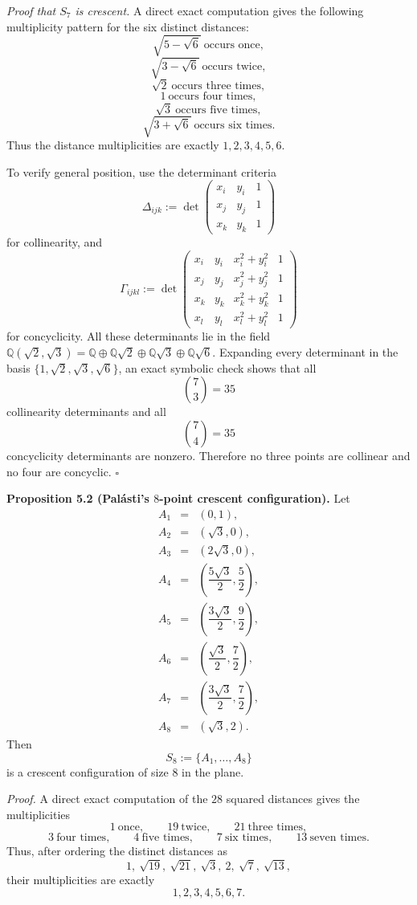 \smallskip
\noindent\emph{Proof that $S_7$ is crescent.}
A direct exact computation gives the following multiplicity pattern for the six distinct distances:
\[
\sqrt{5-\sqrt6}\ \mbox{occurs once},
\]
\[
\sqrt{3-\sqrt6}\ \mbox{occurs twice},
\]
\[
\sqrt2\ \mbox{occurs three times},
\]
\[
1\ \mbox{occurs four times},
\]
\[
\sqrt3\ \mbox{occurs five times},
\]
\[
\sqrt{3+\sqrt6}\ \mbox{occurs six times}.
\]
Thus the distance multiplicities are exactly $1,2,3,4,5,6$.

To verify general position, use the determinant criteria
\[
\Delta_{ijk}:=\det\begin{pmatrix}
x_i&y_i&1\\
x_j&y_j&1\\
x_k&y_k&1
\end{pmatrix}
\]
for collinearity, and
\[
\Gamma_{ijkl}:=\det\begin{pmatrix}
x_i&y_i&x_i^2+y_i^2&1\\
x_j&y_j&x_j^2+y_j^2&1\\
x_k&y_k&x_k^2+y_k^2&1\\
x_l&y_l&x_l^2+y_l^2&1
\end{pmatrix}
\]
for concyclicity. All these determinants lie in the field $\mathbb{Q}(\sqrt2,\sqrt3)=\mathbb{Q}\oplus \mathbb{Q}\sqrt2\oplus \mathbb{Q}\sqrt3\oplus \mathbb{Q}\sqrt6$. Expanding every determinant in the basis $\{1,\sqrt2,\sqrt3,\sqrt6\}$, an exact symbolic check shows that all
\[
\binom73=35
\]
collinearity determinants and all
\[
\binom74=35
\]
concyclicity determinants are nonzero. Therefore no three points are collinear and no four are concyclic.
\hfill$\square$

\medskip
\noindent\textbf{Proposition 5.2 (Pal\'asti's $8$-point crescent configuration).}
Let
\[
\begin{array}{rcl}
A_1&=&(0,1),\\
A_2&=&(\sqrt3,0),\\
A_3&=&(2\sqrt3,0),\\
A_4&=&\left(\dfrac{5\sqrt3}{2},\dfrac52\right),\\
A_5&=&\left(\dfrac{3\sqrt3}{2},\dfrac92\right),\\
A_6&=&\left(\dfrac{\sqrt3}{2},\dfrac72\right),\\
A_7&=&\left(\dfrac{3\sqrt3}{2},\dfrac72\right),\\
A_8&=&(\sqrt3,2).
\end{array}
\]
Then
\[
S_8:=\{A_1,\ldots,A_8\}
\]
is a crescent configuration of size $8$ in the plane.

\smallskip
\noindent\emph{Proof.}
A direct exact computation of the $28$ squared distances gives the multiplicities
\[
1 \ \mbox{once},\qquad 19 \ \mbox{twice},\qquad 21 \ \mbox{three times},
\]
\[
3 \ \mbox{four times},\qquad 4 \ \mbox{five times},\qquad 7 \ \mbox{six times},\qquad 13 \ \mbox{seven times}.
\]
Thus, after ordering the distinct distances as
\[
1,\ \sqrt{19},\ \sqrt{21},\ \sqrt3,\ 2,\ \sqrt7,\ \sqrt{13},
\]
their multiplicities are exactly
\[
1,2,3,4,5,6,7.
\]

